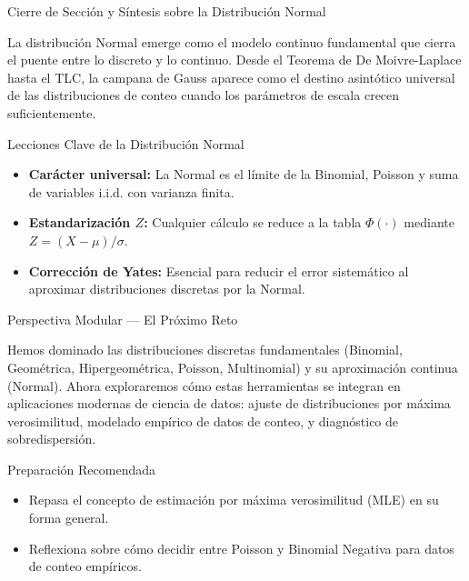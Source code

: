 \documentclass[10pt, aspectratio=169]{beamer}
\begin{document}
\begin{frame}{Cierre de Sección y Síntesis sobre la Distribución Normal}
  \begin{reflexion}
    La distribución Normal emerge como el modelo continuo fundamental que cierra el puente entre lo discreto y lo continuo. Desde el Teorema de De Moivre-Laplace hasta el TLC, la campana de Gauss aparece como el destino asintótico universal de las distribuciones de conteo cuando los parámetros de escala crecen suficientemente.
  \end{reflexion}

  \vspace{0.2cm}
  \pause
  \begin{block}{Lecciones Clave de la Distribución Normal}
    \begin{itemize}\itemsep=0.08cm
      \item \textbf{Carácter universal:} La Normal es el límite de la Binomial, Poisson y suma de variables i.i.d. con varianza finita.
      \item \textbf{Estandarización $Z$:} Cualquier cálculo se reduce a la tabla $\Phi(\cdot)$ mediante $Z = (X - \mu)/\sigma$.
      \item \textbf{Corrección de Yates:} Esencial para reducir el error sistemático al aproximar distribuciones discretas por la Normal.
    \end{itemize}
  \end{block}
\end{frame}

\begin{frame}{Perspectiva Modular --- El Próximo Reto}
  \scriptsize
  \begin{retoclase}
    Hemos dominado las distribuciones discretas fundamentales (Binomial, Geométrica, Hipergeométrica, Poisson, Multinomial) y su aproximación continua (Normal). Ahora exploraremos cómo estas herramientas se integran en aplicaciones modernas de ciencia de datos: ajuste de distribuciones por máxima verosimilitud, modelado empírico de datos de conteo, y diagnóstico de sobredispersión.
  \end{retoclase}

  \vspace{0.08cm}
  \pause
  \begin{alertblock}{Preparación Recomendada}
    \begin{itemize}\itemsep=0.06cm
      \item Repasa el concepto de estimación por máxima verosimilitud (MLE) en su forma general.
      \item Reflexiona sobre cómo decidir entre Poisson y Binomial Negativa para datos de conteo empíricos.
    \end{itemize}
  \end{alertblock}
\end{frame}
\end{document}
